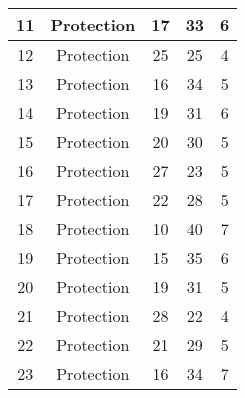 \documentclass[results.tex]{subfiles}
\begin{document}
\begin{center}
\begin{tabular}{| c || c | c | c | c |}
            \hline
            11                      & Protection                   & 17                     & 33                      & 6                    \\
            \hline
            12                      & Protection                   & 25                     & 25                      & 4                    \\
            \hline
            13                      & Protection                   & 16                     & 34                      & 5                    \\
            \hline
            14                      & Protection                   & 19                     & 31                      & 6                    \\
            \hline
            15                      & Protection                   & 20                     & 30                      & 5                    \\
            \hline
            16                      & Protection                   & 27                     & 23                      & 5                    \\
            \hline
            17                      & Protection                   & 22                     & 28                      & 5                    \\
            \hline
            18                      & Protection                   & 10                     & 40                      & 7                    \\
            \hline
            19                      & Protection                   & 15                     & 35                      & 6                    \\
            \hline
            20                      & Protection                   & 19                     & 31                      & 5                    \\
            \hline
            21                      & Protection                   & 28                     & 22                      & 4                    \\
            \hline
            22                      & Protection                   & 21                     & 29                      & 5                    \\
            \hline
            23                      & Protection                   & 16                     & 34                      & 7                    \\

\end{tabular}
\end{center}
\end{document}
